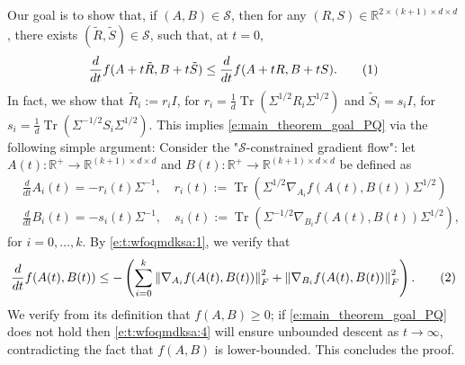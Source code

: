 \documentclass{article}
\newcommand{\R}{\mathbb{R}}
\renewcommand{\S}{{\mathcal S}}
\DeclareMathOperator{\tr}{Tr}
\newcommand*\lrn[1]{\left\| #1 \right\|}
\newcommand*\lrp[1]{\left( #1 \right)}
\newcommand\numberthis{\addtocounter{equation}{1}\tag{\theequation}}
\begin{document}
Our goal is to show that, if $(A,B) \in \S$, then for any $(R,S)\in \R^{2\times (k+1) \times d \times d}$, there exists $(\tilde{R},\tilde{S}) \in \S$, such that, at $t=0$,
\begin{align*}
\frac{d}{dt} f(A + t\tilde{R}, B + t \tilde{S}) \leq \frac{d}{dt} f(A + tR, B + tS).
\numberthis \label{e:t:wfoqmdksa:1}
\end{align*}
In fact, we show that $\tilde{R}_i := r_i I$, for $r_i = \frac{1}{d} \tr\lrp{\Sigma^{1/2} R_i \Sigma^{1/2}}$ and $\tilde{S}_i = s_i I$, for $s_i = \frac{1}{d} \tr \lrp{\Sigma^{-1/2} S_i \Sigma^{1/2}}$. This implies \eqref{e:main_theorem_goal_PQ} via the following simple argument: Consider the "$\S$-constrained gradient flow": let $A(t): \R^+ \to \R^{(k+1)\times d \times d}$ and $B(t): \R^+ \to \R^{(k+1)\times d \times d}$ be defined as 
\begin{align*}
& \frac{d}{dt} A_i(t) = - r_i(t) \Sigma^{-1}, \quad r_i(t) := \tr(\Sigma^{1/2} \nabla_{A_i} f (A(t),B(t)) \Sigma^{1/2})\\
& \frac{d}{dt} B_i(t) = - s_i(t) \Sigma^{-1}, \quad s_i(t) := \tr(\Sigma^{-1/2} \nabla_{B_i} f(A(t),B(t)) \Sigma^{1/2}),
\end{align*}
for $i=0,\dots,k$. By \eqref{e:t:wfoqmdksa:1}, we verify that
\begin{align*}
\frac{d}{dt} f(A(t),B(t)) \leq - \lrp{\sum_{i=0}^k \lrn{\nabla_{A_i} f(A(t),B(t))}_F^2 + \lrn{\nabla_{B_i}f(A(t),B(t))}_F^2}.
\numberthis \label{e:t:wfoqmdksa:4}
\end{align*}
We verify from its definition that $f(A,B) \geq 0$; if \eqref{e:main_theorem_goal_PQ} does not hold then \eqref{e:t:wfoqmdksa:4} will ensure unbounded descent as $t\to \infty$, contradicting the fact that $f(A,B)$ is lower-bounded. This concludes the proof.
\end{document}
